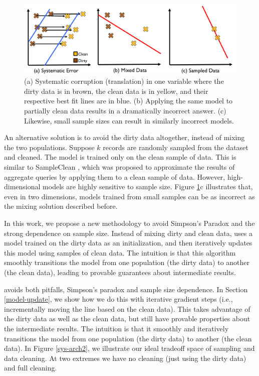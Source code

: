 \begin{figure}[ht!]
\centering
 \includegraphics[width=\columnwidth]{figs/update-arch.png}
 \caption{(a) Systematic corruption (translation) in one variable where the dirty data is in brown, the clean data is in yellow, and their respective best fit lines are in blue. 
 (b) Applying the same model to partially clean data results in a dramatically incorrect answer.
(c) Likewise, small sample sizes can result in similarly incorrect models. \label{update-arch1}}
\end{figure}

An alternative solution is to avoid the dirty data altogether, instead of mixing the two populations.
Suppose $k$ records are randomly sampled from the dataset and cleaned.
The model is trained only on the clean sample of data.
This is similar to SampleClean \cite{wang1999sample}, which was proposed to approximate the results of aggregate queries by applying them to a clean sample of data.
However, high-dimensional models are highly sensitive to sample size.
Figure \ref{update-arch1}c illustrates that, even in two dimensions, models trained from small samples can be as incorrect as the mixing solution described before.

In this work, we propose a new methodology to avoid Simpson's Paradox and the strong dependence on sample size.
Instead of mixing dirty and clean data, \sys uses a model trained on the dirty data as an initialization, and then iteratively updates this model using samples of clean data.
The intuition is that this algorithm smoothly transitions the model from one population (the dirty data) to another (the clean data), leading to provable guarantees about intermediate results.


\iffalse
\sys avoids both pitfalls, Simpson's paradox and sample size dependence.
In Section \ref{model-update}, we show how we do this with iterative gradient steps (i.e., incrementally moving the line based on the clean data).
This takes advantage of the dirty data as well as the clean data, but still have provable properties about the intermediate results.
The intuition is that it smoothly and iteratively transitions the model from one population (the dirty data) to another (the clean data).
In Figure \ref{sys-arch2}, we illustrate our ideal tradeoff space of sampling and data cleaning.
At two extremes we have no cleaning (just using the dirty data) and full cleaning.

